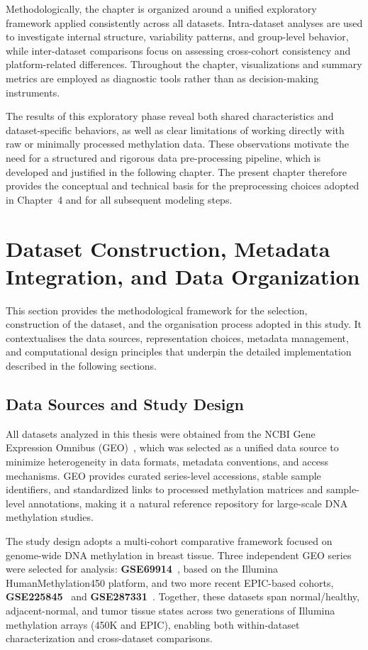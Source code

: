 Methodologically, the chapter is organized around a unified exploratory framework applied consistently across all datasets. Intra-dataset analyses are used to investigate internal structure, variability patterns, and group-level behavior, while inter-dataset comparisons focus on assessing cross-cohort consistency and platform-related differences. Throughout the chapter, visualizations and summary metrics are employed as diagnostic tools rather than as decision-making instruments.

The results of this exploratory phase reveal both shared characteristics and dataset-specific behaviors, as well as clear limitations of working directly with raw or minimally processed methylation data. These observations motivate the need for a structured and rigorous data pre-processing pipeline, which is developed and justified in the following chapter. The present chapter therefore provides the conceptual and technical basis for the preprocessing choices adopted in Chapter~4 and for all subsequent modeling steps.

\section{Dataset Construction, Metadata Integration, and Data Organization}

This section provides the methodological framework for the selection, construction of the dataset, and the organisation process adopted in this study. It contextualises the data sources, representation choices, metadata management, and computational design principles that underpin the detailed implementation described in the following sections.

\subsection{Data Sources and Study Design}

All datasets analyzed in this thesis were obtained from the NCBI Gene Expression Omnibus (GEO)~\cite{GEO_NCBI}, which was selected as a unified data source to minimize heterogeneity in data formats, metadata conventions, and access mechanisms. GEO provides curated series-level accessions, stable sample identifiers, and standardized links to processed methylation matrices and sample-level annotations, making it a natural reference repository for large-scale DNA methylation studies.

The study design adopts a multi-cohort comparative framework focused on genome-wide DNA methylation in breast tissue. Three independent GEO series were selected for analysis: \textbf{GSE69914}~\cite{GSE69914}, based on the Illumina HumanMethylation450 platform, and two more recent EPIC-based cohorts, \textbf{GSE225845}~\cite{GSE225845} and \textbf{GSE287331}~\cite{GSE287331}. Together, these datasets span normal/healthy, adjacent-normal, and tumor tissue states across two generations of Illumina methylation arrays (450K and EPIC), enabling both within-dataset characterization and cross-dataset comparisons.

